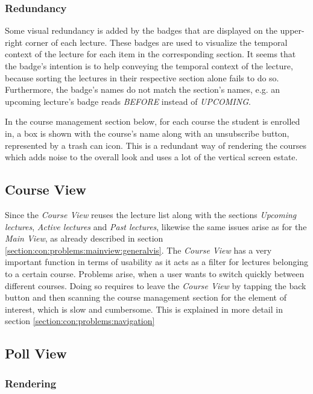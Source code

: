 \subsubsection{Redundancy}

Some visual redundancy is added by the badges that are displayed on the upper-right corner of each lecture. These badges are used to visualize the temporal context of the lecture for each item in the corresponding section. It seems that the badge's intention is to help conveying the temporal context of the lecture, because sorting the lectures in their respective section alone fails to do so. Furthermore, the badge's names do not match the section's names, e.g. an upcoming lecture's badge reads \emph{BEFORE} instead of \emph{UPCOMING}. 

In the course management section below, for each course the student is enrolled in, a box is shown with the course's name along with an unsubscribe button, represented by a trash can icon.
\todogrf
This is a redundant way of rendering the courses which adds noise to the overall look
and uses a lot of the vertical screen estate.

\subsection{Course View}
\label{section:con:problems:courseview}
Since the \emph{Course View} reuses the lecture list along with the sections \emph{Upcoming lectures}, \emph{Active lectures} and \emph{Past lectures}, likewise the same issues arise as for the \emph{Main View}, as already described in section \ref{section:con:problems:mainview:generalvis}. 
The \emph{Course View} has a very important function in terms of usability as it acts as a filter for lectures belonging to a certain course. Problems arise, when a user wants to switch quickly between different courses. Doing so requires to leave the \emph{Course View} by tapping the back button and then scanning the course management section for the element of interest, which is slow and cumbersome. This is explained in more detail in section \ref{section:con:problems:navigation}

\subsection{Poll View}

\subsubsection{Rendering}

